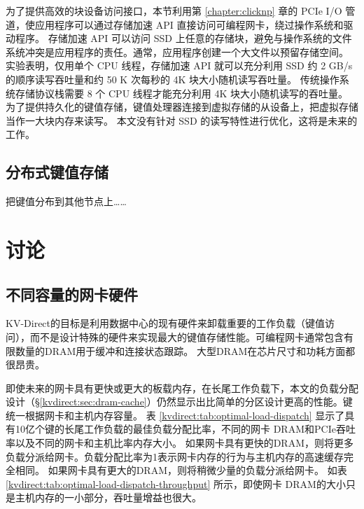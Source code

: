 为了提供高效的块设备访问接口，本节利用第 \ref{chapter:clicknp} 章的 PCIe I/O 管道，使应用程序可以通过存储加速 API 直接访问可编程网卡，绕过操作系统和驱动程序。
存储加速 API 可以访问 SSD 上任意的存储块，避免与操作系统的文件系统冲突是应用程序的责任。通常，应用程序创建一个大文件以预留存储空间。
实验表明，仅用单个 CPU 线程，存储加速 API 就可以充分利用 SSD 约 2 GB/s 的顺序读写吞吐量和约 50 K 次每秒的 4K 块大小随机读写吞吐量。
传统操作系统存储协议栈需要 8 个 CPU 线程才能充分利用 4K 块大小随机读写的吞吐量。
为了提供持久化的键值存储，键值处理器连接到虚拟存储的从设备上，把虚拟存储当作一大块内存来读写。
本文没有针对 SSD 的读写特性进行优化，这将是未来的工作。






\subsection{分布式键值存储}

把键值分布到其他节点上……


\section{讨论}
\label{kvdirect:sec:discussion}

\subsection{不同容量的网卡硬件}
\label{kvdirect:sec:different-nic}

KV-Direct的目标是利用数据中心的现有硬件来卸载重要的工作负载（键值访问），而不是设计特殊的硬件来实现最大的键值存储性能。可编程网卡通常包含有限数量的DRAM用于缓冲和连接状态跟踪。 大型DRAM在芯片尺寸和功耗方面都很昂贵。

即使未来的网卡具有更快或更大的板载内存，在长尾工作负载下，本文的负载分配设计（\S \ref {kvdirect:sec:dram-cache}）仍然显示出比简单的分区设计更高的性能。键统一根据网卡和主机内存容量。
表 \ref {kvdirect:tab:optimal-load-dispatch} 显示了具有10亿个键的长尾工作负载的最佳负载分配比率，不同的网卡 DRAM和PCIe吞吐率以及不同的网卡和主机比率内存大小。
如果网卡具有更快的DRAM，则将更多负载分派给网卡。负载分配比率为1表示网卡内存的行为与主机内存的高速缓存完全相同。
如果网卡具有更大的DRAM，则将稍微少量的负载分派给网卡。
如表 \ref {kvdirect:tab:optimal-load-dispatch-throughput} 所示，即使网卡 DRAM的大小只是主机内存的一小部分，吞吐量增益也很大。


